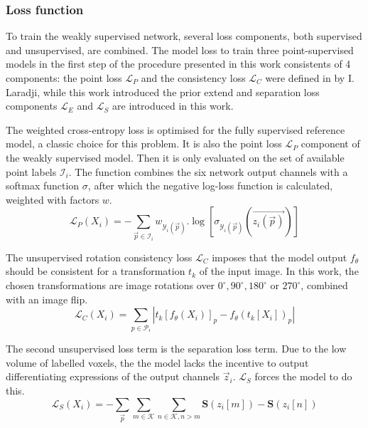 \begin{multicols}{2}
\subsubsection*{Loss function}
\par{
    To train the weakly supervised network, several loss components, both supervised and unsupervised, are combined.
    The model loss to train three point-supervised models in the first step of the procedure presented in this work consistents of 4 components:
    the point loss $\mathcal{L}_P$ and the consistency loss $\mathcal{L}_C$ were defined in \cite{Laradji2021} by I. Laradji, while this work introduced the prior extend and separation loss components $\mathcal{L}_E$ and $\mathcal{L}_S$ are introduced in this work.
}
\par{
    The weighted cross-entropy loss is optimised for the fully supervised reference model, a classic choice for this problem.
    It is also the point loss $\mathcal{L}_P$ component of the weakly supervised model. Then it is only evaluated on the set of available point labels $\mathcal{I}_i$.
    The function combines the six network output channels with a softmax function $\sigma$, after which the negative log-loss function is calculated, weighted with factors $w$.
}
\begin{equation} \label{eq:crossEntropy}
    \mathcal{L}_P(X_i) = -\sum_{\vec{p} \in \mathcal{I}_i} w_{\mathcal{Y}_i(\vec{p})}.\log\left[\sigma_{\mathcal{Y}_i(\vec{p})}\left(\vec{z_i(\vec{p})}\right)\right]
\end{equation}
\par{
    The unsupervised rotation consistency loss $\mathcal{L}_C$ imposes that the model output $f_\theta$ should be consistent for a transformation $t_k$ of the input image.
    In this work, the chosen transformations are image rotations over $0^\circ, 90^\circ, 180^\circ$ or $270^\circ$, combined with an image flip.
}
\begin{equation}
    \mathcal{L}_C(X_i) = \sum_{p \in \mathcal{P}_i} \left| t_k\left[f_\theta(X_i)\right]_p - f_\theta\left( t_k[X_i] \right)_p  \right|  
\end{equation}
\par{
    The second unsupervised loss term is the separation loss term. 
    Due to the low volume of labelled voxels, the the model lacks the incentive to output differentiating expressions of the output channels $\vec{z}_i$.
    $\mathcal{L}_S$ forces the model to do this.
}
\begin{equation}
    \mathcal{L}_S(X_i) = - \sum_{\vec{p}} \sum_{m\in \mathcal{K}} \sum_{n \in \mathcal{K}, n>m} \mathbf{S}(z_i[m]) - \mathbf{S}(z_i[n])

\end{equation}
\end{multicols}
